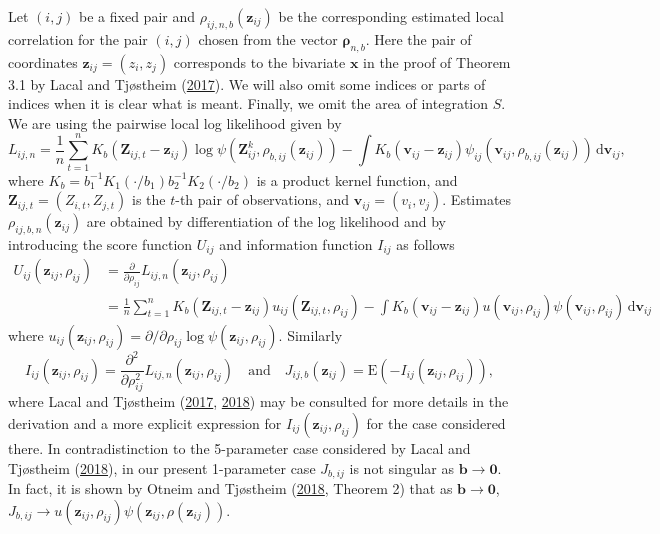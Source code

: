 \documentclass[
  12pt,
  letterpaper]{article}
\numberwithin{equation}{section}
\newcommand{\x}{\bm{x}}
\newcommand{\Z}{\bm{Z}}
\newcommand{\z}{\bm{z}}
\newcommand{\fv}{\bm{v}}
\newcommand{\frho}{\bm{\rho}}
\newcommand{\bb}{\bm{b}}
\newcommand{\E}{\textrm{E}}
\newcommand{\di}{\,\textrm{d}}
\begin{document}
Let \((i,j)\) be a fixed pair and \(\rho_{ij,n,b}(\z_{ij})\) be the corresponding estimated local correlation for the pair \((i,j)\) chosen from the vector \(\frho_{n,b}\). Here the pair of coordinates \(\z_{ij} = (z_i,z_j)\) corresponds to the bivariate \(\x\) in the proof of Theorem 3.1 by Lacal and Tjøstheim (\protect\hyperlink{ref-lacal2017local}{2017}). We will also omit some indices or parts of indices when it is clear what is meant. Finally, we omit the area of integration \(S\). We are using the pairwise local log likelihood given by
\[
L_{ij,n} = \frac{1}{n} \sum_{t=1}^{n} K_b(\Z_{ij,t}-\z_{ij}) \log \psi\left(\Z_{ij}^{k},\rho_{b,ij}(\z_{ij})\right) - \int K_b(\fv_{ij}-\z_{ij}) \psi_{ij}(\fv_{ij},\rho_{b,ij}(\z_{ij})) \di \fv_{ij},
\]
where \(K_b = b_1^{-1}K_1(\cdot/b_1) b_2^{-1} K_2(\cdot/b_2)\) is a product kernel function, and \(\Z_{ij,t} = (Z_{i,t},Z_{j,t})\) is the \(t\)-th pair of observations, and \(\fv_{ij} = (v_i,v_j)\). Estimates \(\rho_{ij,b,n}(\z_{ij})\) are obtained by differentiation of the log likelihood and by introducing the score function \(U_{ij}\) and information function \(I_{ij}\) as follows
\begin{align*}
U_{ij}(\z_{ij},\rho_{ij}) & = \frac{\partial}{\partial \rho_{ij}}L_{ij,n}(\z_{ij},\rho_{ij}) \\
& = \frac{1}{n}\sum_{t=1}^{n}K_b(\Z_{ij,t}-\z_{ij})u_{ij}(\Z_{ij,t},\rho_{ij}) - 
\int K_b(\fv_{ij}-\z_{ij})u(\fv_{ij},\rho_{ij})\psi(\fv_{ij},\rho_{ij}) \di \fv_{ij}
\end{align*}
where \(u_{ij}(\z_{ij},\rho_{ij}) = \partial/\partial \rho_{ij} \log \psi(\z_{ij},\rho_{ij})\). Similarly
\[
I_{ij}(\z_{ij},\rho_{ij}) = \frac{\partial^2}{\partial \rho_{ij}^2} L_{ij,n}(\z_{ij}, \rho_{ij}) \quad \mbox{and} \quad J_{ij,b}(\z_{ij}) = \E(-I_{ij}(\z_{ij},\rho_{ij})),
\]
where Lacal and Tjøstheim (\protect\hyperlink{ref-lacal2017local}{2017}, \protect\hyperlink{ref-lacal2018estimating}{2018}) may be consulted for more details in the derivation and a more explicit expression for \(I_{ij}(\z_{ij},\rho_{ij})\) for the case considered there. In contradistinction to the 5-parameter case considered by Lacal and Tjøstheim (\protect\hyperlink{ref-lacal2018estimating}{2018}), in our present 1-parameter case \(J_{b,ij}\) is not singular as \(\bb \to \bm{0}\). In fact, it is shown by Otneim and Tjøstheim (\protect\hyperlink{ref-otneim2017conditional}{2018}, Theorem 2) that as \(\bb \to \bm{0}\), \(J_{b,ij} \to u(\z_{ij},\rho_{ij})\psi(\z_{ij},\rho(\z_{ij}))\).
\end{document}
